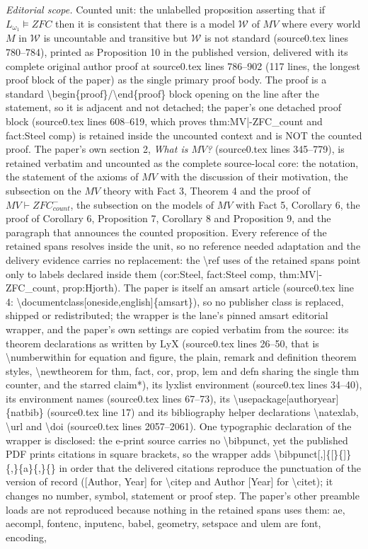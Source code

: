 \documentclass[10pt,a4paper]{amsart}
\numberwithin{equation}{section}
\numberwithin{figure}{section}
\theoremstyle{plain}
\theoremstyle{plain}
\theoremstyle{plain}
\theoremstyle{plain}
\theoremstyle{remark}
\theoremstyle{plain}
\theoremstyle{definition}
\begin{document}
\noindent\textit{Editorial scope.} Counted unit: the unlabelled proposition asserting that if $L_{\omega_{1}}\models ZFC$ then it is consistent that there is a model $\mathcal{W}$ of $MV$ where every world $M$ in $\mathcal{W}$ is uncountable and transitive but $\mathcal{W}$ is not standard (source0.tex lines 780--784), printed as Proposition 10 in the published version, delivered with its complete original author proof at source0.tex lines 786--902 (117 lines, the longest proof block of the paper) as the single primary proof body. The proof is a standard \textbackslash{}begin\{proof\}/\textbackslash{}end\{proof\} block opening on the line after the statement, so it is adjacent and not detached; the paper's one detached proof block (source0.tex lines 608--619, which proves thm:MV|-ZFC\_count and fact:Steel comp) is retained inside the uncounted context and is NOT the counted proof. The paper's own section 2, \emph{What is $MV$?} (source0.tex lines 345--779), is retained verbatim and uncounted as the complete source-local core: the notation, the statement of the axioms of $MV$ with the discussion of their motivation, the subsection on the $MV$ theory with Fact 3, Theorem 4 and the proof of $MV\vdash ZFC^{-}_{count}$, the subsection on the models of $MV$ with Fact 5, Corollary 6, the proof of Corollary 6, Proposition 7, Corollary 8 and Proposition 9, and the paragraph that announces the counted proposition. Every reference of the retained spans resolves inside the unit, so no reference needed adaptation and the delivery evidence carries no replacement: the \textbackslash{}ref uses of the retained spans point only to labels declared inside them (cor:Steel, fact:Steel comp, thm:MV|-ZFC\_count, prop:Hjorth). The paper is itself an amsart article (source0.tex line 4: \textbackslash{}documentclass[oneside,english]\{amsart\}), so no publisher class is replaced, shipped or redistributed; the wrapper is the lane's pinned amsart editorial wrapper, and the paper's own settings are copied verbatim from the source: its theorem declarations as written by LyX (source0.tex lines 26--50, that is \textbackslash{}numberwithin for equation and figure, the plain, remark and definition theorem styles, \textbackslash{}newtheorem for thm, fact, cor, prop, lem and defn sharing the single thm counter, and the starred claim*), its lyxlist environment (source0.tex lines 34--40), its environment names (source0.tex lines 67--73), its \textbackslash{}usepackage[authoryear]\{natbib\} (source0.tex line 17) and its bibliography helper declarations \textbackslash{}natexlab, \textbackslash{}url and \textbackslash{}doi (source0.tex lines 2057--2061). One typographic declaration of the wrapper is disclosed: the e-print source carries no \textbackslash{}bibpunct, yet the published PDF prints citations in square brackets, so the wrapper adds \textbackslash{}bibpunct[,]\{[\}\{]\}\{,\}\{a\}\{,\}\{\} in order that the delivered citations reproduce the punctuation of the version of record ([Author, Year] for \textbackslash{}citep and Author [Year] for \textbackslash{}citet); it changes no number, symbol, statement or proof step. The paper's other preamble loads are not reproduced because nothing in the retained spans uses them: ae, aecompl, fontenc, inputenc, babel, geometry, setspace and ulem are font, encoding, 
\end{document}

